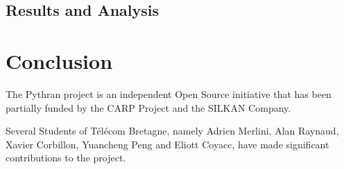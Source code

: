 \documentclass[10pt, preprint]{sigplanconf}
\begin{document}
\subsection{Results and Analysis}

\section*{Conclusion}

\acks

The Pythran project is an independent Open Source initiative that has been
partially funded by the CARP Project and the SILKAN Company.

Several Students of Télécom Bretagne, namely Adrien Merlini, Alan Raynaud,
Xavier Corbillon, Yuancheng Peng and Eliott Coyacc, have made significant
contributions to the project.




\end{document}
